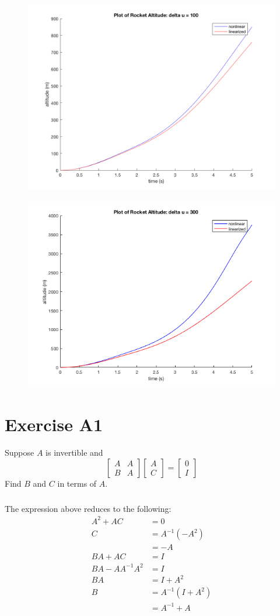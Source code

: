 \documentclass[11pt]{article}
\begin{document}
\begin{figure}[h!]
	\centering
	\includegraphics[width=0.6\linewidth]{plot100.png}
	\caption{}
	\label{fig:100}
\end{figure}
\begin{figure}[h!]
	\centering
	\includegraphics[width=0.6\linewidth]{plot300.png}
	\caption{}
	\label{fig:300}
\end{figure}

\section*{Exercise A1}
Suppose $A$ is invertible and 
\begin{equation*}
	\begin{bmatrix} A & A \\ B & A \end{bmatrix} \begin{bmatrix} A \\ C \end{bmatrix} = \begin{bmatrix} 0 \\ I \end{bmatrix}
\end{equation*}
Find $B$ and $C$ in terms of $A$.

\subparagraph*{}
The expression above reduces to the following:
\begin{align*}
	A^2 + AC &= 0 \\
	C &= A^{-1}(-A^2) \\
	&= -A \\
	BA + AC &= I \\
	BA - AA^{-1}A^2 &= I \\
	BA &= I + A^2 \\
	B &= A^{-1}(I+A^2) \\
	&= A^{-1} + A
\end{align*}
\end{document}
